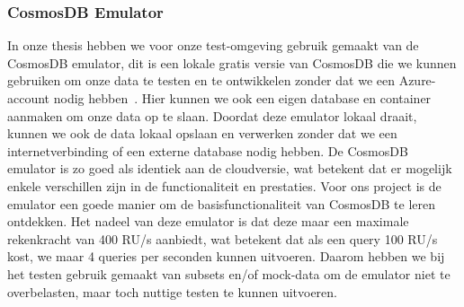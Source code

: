 \subsubsection{CosmosDB Emulator}
In onze thesis hebben we voor onze test-omgeving gebruik gemaakt van de CosmosDB emulator, dit is een lokale gratis versie van CosmosDB die we kunnen gebruiken om onze data te testen en te ontwikkelen zonder dat we een Azure-account nodig hebben~\autocite{Tharan2024}.
Hier kunnen we ook een eigen database en container aanmaken om onze data op te slaan. Doordat deze emulator lokaal draait, kunnen we ook de data lokaal opslaan en verwerken zonder dat we een internetverbinding of een externe database nodig hebben.
De CosmosDB emulator is zo goed als identiek aan de cloudversie, wat betekent dat er mogelijk enkele verschillen zijn in de functionaliteit en prestaties.
Voor ons project is de emulator een goede manier om de basisfunctionaliteit van CosmosDB te leren ontdekken.
Het nadeel van deze emulator is dat deze maar een maximale rekenkracht van 400 RU/s aanbiedt, wat betekent dat als een query 100 RU/s kost, we maar 4 queries per seconden kunnen uitvoeren.
Daarom hebben we bij het testen gebruik gemaakt van subsets en/of mock-data om de emulator niet te overbelasten, maar toch nuttige testen te kunnen uitvoeren.

